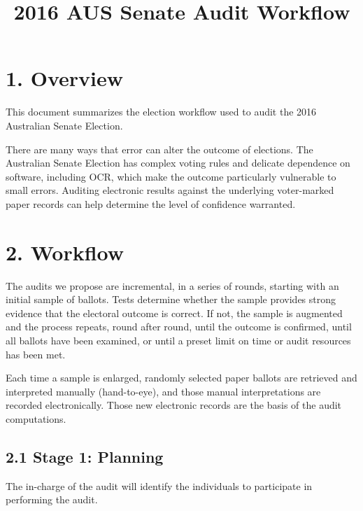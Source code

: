\documentclass[]{article}
\title{\protect\hypertarget{_kijxneej980z}{}{}

\protect\hypertarget{_1t5wdgb8h9yb}{}{}2016 AUS Senate Audit Workflow}
\date{}
\begin{document}
\maketitle

\subsection{}\label{section}

\section{1. Overview}\label{overview}

This document summarizes the election workflow used to audit the 2016
Australian Senate Election.

There are many ways that error can alter the outcome of elections. The
Australian Senate Election has complex voting rules and delicate
dependence on software, including OCR, which make the outcome
particularly vulnerable to small errors. Auditing electronic results
against the underlying voter-marked paper records can help determine the
level of confidence warranted.

\section{2. Workflow}\label{workflow}

The audits we propose are incremental, in a series of rounds, starting
with an initial sample of ballots. Tests determine whether the sample
provides strong evidence that the electoral outcome is correct. If not,
the sample is augmented and the process repeats, round after round,
until the outcome is confirmed, until all ballots have been examined, or
until a preset limit on time or audit resources has been met.

Each time a sample is enlarged, randomly selected paper ballots are
retrieved and interpreted manually (hand-to-eye), and those manual
interpretations are recorded electronically. Those new electronic
records are the basis of the audit computations.

\subsection{2.1 Stage 1: Planning}\label{stage-1-planning}

The in-charge of the audit will identify the individuals to participate
in performing the audit.
\end{document}

